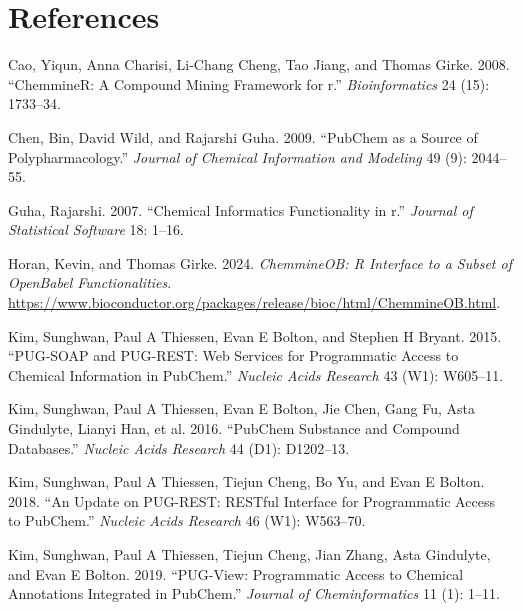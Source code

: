 \hypertarget{references}{%
\section*{References}\label{references}}

\hypertarget{refs}{}
\begin{CSLReferences}{1}{0}
\leavevmode{}%
Cao, Yiqun, Anna Charisi, Li-Chang Cheng, Tao Jiang, and Thomas Girke. 2008. {``ChemmineR: A Compound Mining Framework for r.''} \emph{Bioinformatics} 24 (15): 1733--34.

\leavevmode{}%
Chen, Bin, David Wild, and Rajarshi Guha. 2009. {``PubChem as a Source of Polypharmacology.''} \emph{Journal of Chemical Information and Modeling} 49 (9): 2044--55.

\leavevmode{}%
Guha, Rajarshi. 2007. {``Chemical Informatics Functionality in r.''} \emph{Journal of Statistical Software} 18: 1--16.

\leavevmode{}%
Horan, Kevin, and Thomas Girke. 2024. \emph{ChemmineOB: R Interface to a Subset of OpenBabel Functionalities}. \url{https://www.bioconductor.org/packages/release/bioc/html/ChemmineOB.html}.

\leavevmode{}%
Kim, Sunghwan, Paul A Thiessen, Evan E Bolton, and Stephen H Bryant. 2015. {``PUG-SOAP and PUG-REST: Web Services for Programmatic Access to Chemical Information in PubChem.''} \emph{Nucleic Acids Research} 43 (W1): W605--11.

\leavevmode{}%
Kim, Sunghwan, Paul A Thiessen, Evan E Bolton, Jie Chen, Gang Fu, Asta Gindulyte, Lianyi Han, et al. 2016. {``PubChem Substance and Compound Databases.''} \emph{Nucleic Acids Research} 44 (D1): D1202--13.

\leavevmode{}%
Kim, Sunghwan, Paul A Thiessen, Tiejun Cheng, Bo Yu, and Evan E Bolton. 2018. {``An Update on PUG-REST: RESTful Interface for Programmatic Access to PubChem.''} \emph{Nucleic Acids Research} 46 (W1): W563--70.

\leavevmode{}%
Kim, Sunghwan, Paul A Thiessen, Tiejun Cheng, Jian Zhang, Asta Gindulyte, and Evan E Bolton. 2019. {``PUG-View: Programmatic Access to Chemical Annotations Integrated in PubChem.''} \emph{Journal of Cheminformatics} 11 (1): 1--11.


\end{CSLReferences}
